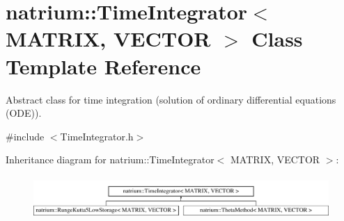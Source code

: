 \hypertarget{classnatrium_1_1TimeIntegrator}{\section{natrium\-:\-:Time\-Integrator$<$ M\-A\-T\-R\-I\-X, V\-E\-C\-T\-O\-R $>$ Class Template Reference}
\label{classnatrium_1_1TimeIntegrator}
}


Abstract class for time integration (solution of ordinary differential equations (O\-D\-E)).  




{\ttfamily \#include $<$Time\-Integrator.\-h$>$}

Inheritance diagram for natrium\-:\-:Time\-Integrator$<$ M\-A\-T\-R\-I\-X, V\-E\-C\-T\-O\-R $>$\-:\begin{figure}[H]
\begin{center}
\leavevmode
\includegraphics[height=1.666667cm]{classnatrium_1_1TimeIntegrator}
\end{center}
\end{figure}
